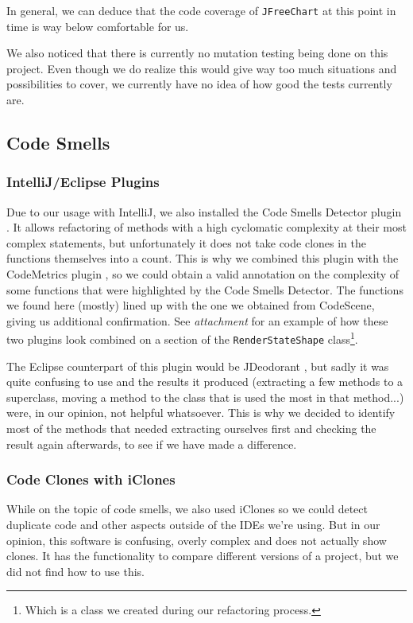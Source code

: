 \documentclass[11pt]{article}
\begin{document}
	In general, we can deduce that the code coverage of \texttt{JFreeChart} at this point in time is way below comfortable for us.
	
	We also noticed that there is currently no mutation testing being done on this project. Even though we do realize this would give way too much situations and possibilities to cover, we currently have no idea of how good the tests currently are.
	
	\subsection{Code Smells}
	\subsubsection{IntelliJ/Eclipse Plugins}	
	Due to our usage with \textsf{IntelliJ}, we also installed the \textsf{Code Smells Detector} plugin \cite{jetbrains-csd}. It allows refactoring of methods with a high cyclomatic complexity at their most complex statements, but unfortunately it does not take code clones in the functions themselves into a count. This is why we combined this plugin with the \textsf{CodeMetrics} plugin \cite{jetbrains-cm}, so we could obtain a valid annotation on the complexity of some functions that were highlighted by the \textsf{Code Smells Detector}. The functions we found here (mostly) lined up with the one we obtained from \textsf{CodeScene}, giving us additional confirmation. See \textsl{attachment \pageref{intellij-plugins}} for an example of how these two plugins look combined on a section of the \texttt{RenderStateShape} class\footnote{Which is a class we created during our refactoring process.}.
	
	The \textsf{Eclipse} counterpart of this plugin would be \textsf{JDeodorant} \cite{jdeodorant}, but sadly it was quite confusing to use and the results it produced (extracting a few methods to a superclass, moving a method to the class that is used the most in that method...) were, in our opinion, not helpful whatsoever. This is why we decided to identify most of the methods that needed extracting ourselves first and checking the result again afterwards, to see if we have made a difference.
	
	\subsubsection{Code Clones with iClones}
	While on the topic of code smells, we also used \textsf{iClones} so we could detect duplicate code and other aspects outside of the IDEs we're using. But in our opinion, this software is confusing, overly complex and does not actually show clones. It has the functionality to compare different versions of a project, but we did not find how to use this.
	
\end{document}
